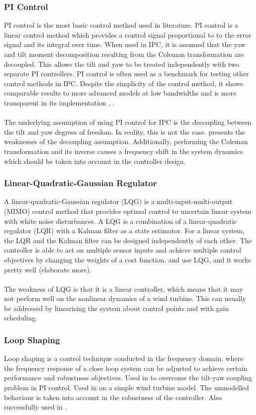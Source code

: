 \subsubsection{PI Control}
PI control is the most basic control method used in literature. PI control is a linear control method which provides a control signal proportional to to the error signal and its integral over time. When used in IPC, it is assumed that the yaw and tilt moment decomposition resulting from the Coleman transformation are decoupled. This allows the tilt and yaw to be treated independently with two separate PI controllers. PI control is often used as a benchmark for testing other control methods in IPC. Despite the simplicity of the control method, it shows comparable results to more advanced models at low bandwidths and is more transparent in its implementation \cite{6_Mirzaei}, \cite{14_Selvam}. 
\\~\\
The underlying assumption of using PI control for IPC is the decoupling between the tilt and yaw degrees of freedom. In reality, this is not the case. \citet{1_Lu} presents the weaknesses of the decoupling assumption. Additionally, performing the Coleman transformation and its inverse causes a frequency shift in the system dynamics which should be taken into account in the controller design. 
\subsubsection{Linear-Quadratic-Gaussian Regulator}
A linear-quadratic-Gaussian regulator (LQG) is a multi-input-multi-output (MIMO) control method that provides optimal control to uncertain linear system with white noise disturbances. A LQG is a combination of a linear-quadratic regulator (LQR) with a Kalman filter as a state estimator. For a linear system, the LQR and the Kalman filter can be designed independently of each other. The controller is able to act on multiple sensor inputs and achieve multiple control objectives by changing the weights of a cost function.  \citet{14_Selvam} and \citet{5_Bossanyi} use LQG, and it works pretty well (elaborate more).
\\~\\
The weakness of LQG is that it is a linear controller, which means that it may not perform well on the nonlinear dynamics of a wind turbine. This can usually be addressed by linearising the system about control points and with gain scheduling.
\subsubsection{Loop Shaping}
Loop shaping is a control technique conducted in the frequency domain, where the frequency response of a close loop system can be adjusted to achieve certain performance and robustness objectives. Used in \cite{1_Lu} to overcome the tilt-yaw coupling problem in PI control. Used in \citet{17_Geyler} on a simple wind turbine model. The unmodelled behaviour is taken into account in the robustness of the \hinfty controller. Also successfully used in \citet{2_Kanev}.
